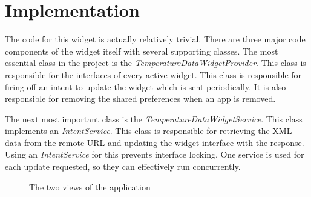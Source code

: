 \documentclass[paper=a4, fontsize=11pt]{scrartcl}	%
\numberwithin{equation}{section}															%
\numberwithin{figure}{section}																%
\numberwithin{table}{section}
\begin{document}
\section{Implementation}
The code for this widget is actually relatively trivial. There are three major code components of the widget itself with several supporting classes. The most essential class in the project is the \textit{TemperatureDataWidgetProvider}. This class is responsible for the interfaces of every active widget. This class is responsible for firing off an intent to update the widget which is sent periodically. It is also responsible for removing the shared preferences when an app is removed.

The next most important class is the \textit{TemperatureDataWidgetService}. This class implements an \textit{IntentService}. This class is responsible for retrieving the XML data from the remote URL and updating the widget interface with the response. Using an \textit{IntentService} for this prevents interface locking. One service is used for each update requested, so they can effectively run concurrently.

\begin{figure}[ht]
\centering
{}
\caption{The two views of the application}
\label{fig:application-views}
\end{figure}
\end{document}
